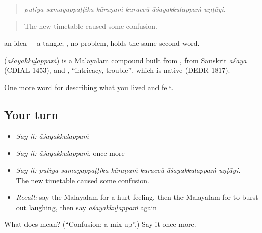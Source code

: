 \begin{quote}
\emph{putiya samayappaṭṭika kāraṇaṁ kuṟaccŭ āśayakkuḻappaṁ uṇṭāyi.}
\end{quote}

\begin{quote}
The new timetable caused some confusion.
\end{quote}

 an idea +  a tangle; , no problem, holds the same second word.

\begin{cousinweb}
\textbf{} (\emph{āśayakkuḻappaṁ}) is a Malayalam compound built from , from Sanskrit \emph{āśaya} (CDIAL 1453), and , \textquotedblleft{}intricacy, trouble\textquotedblright{}, which is native (DEDR 1817).
\end{cousinweb}

\begin{grammarlens}[title={What you've built}]
One more word for describing what you lived and felt.
\end{grammarlens}

\subsection*{Your turn}
\begin{itemize}
\raggedright
  \item \emph{Say it:} \emph{āśayakkuḻappaṁ}
  \item \emph{Say it:} \emph{āśayakkuḻappaṁ}, once more
  \item \emph{Say it:} \emph{putiya samayappaṭṭika kāraṇaṁ kuṟaccŭ āśayakkuḻappaṁ uṇṭāyi.} — The new timetable caused some confusion.
  \item \emph{Recall:} say the Malayalam for a hurt feeling, then the Malayalam for to burst out laughing, then say \emph{āśayakkuḻappaṁ} again
\end{itemize}

\begin{tcolorbox}[breakable,colback=teal!4,colframe=teal!35!black,title={Before you move on}]
What does  mean? (\textquotedblleft{}Confusion; a mix-up\textquotedblright{}.) Say it once more.
\end{tcolorbox}

